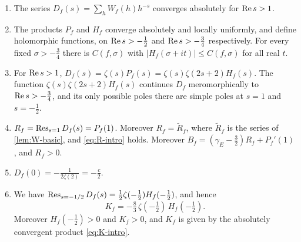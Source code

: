 \begin{proposition}\label{prop:Df}
\begin{enumerate}[label=(\alph*)]
\item The series $D_f(s)=\sum_hW_f(h)h^{-s}$ converges absolutely for $\operatorname{Re} s>1$.
\item The products $P_f$ and $H_f$ converge absolutely and locally uniformly, and define holomorphic functions, on $\operatorname{Re} s>-\frac12$ and $\operatorname{Re} s>-\frac34$ respectively. For every fixed $\sigma>-\frac34$ there is $C(f,\sigma)$ with $|H_f(\sigma+it)|\le C(f,\sigma)$ for all real $t$.
\item For $\operatorname{Re} s>1$, $D_f(s)=\zeta(s)P_f(s)=\zeta(s)\zeta(2s+2)H_f(s)$. The function $\zeta(s)\zeta(2s+2)H_f(s)$ continues $D_f$ meromorphically to $\operatorname{Re} s>-\frac34$, and its only possible poles there are simple poles at $s=1$ and $s=-\frac12$.
\item $R_f=\operatorname*{Res}_{s=1}D_f(s)=P_f(1)$. Moreover $R_f=\widetilde R_f$, where $\widetilde R_f$ is the series of \cref{lem:W-basic}, and \eqref{eq:R-intro} holds. Moreover $B_f=(\gamma_E-\frac32)R_f+P_f'(1)$, and $R_f>0$.
\item $D_f(0)=-\frac1{2\zeta(2)}=-\frac c2$.
\item We have $\operatorname*{Res}_{s=-1/2}D_f(s)=\frac12\zeta(-\frac12)H_f(-\frac12)$, and hence
\[
K_f=-\tfrac83\,\zeta(-\tfrac12)\,H_f(-\tfrac12).
\]
Moreover $H_f(-\frac12)>0$ and $K_f>0$, and $K_f$ is given by the absolutely convergent product \eqref{eq:K-intro}.
\end{enumerate}
\end{proposition}

